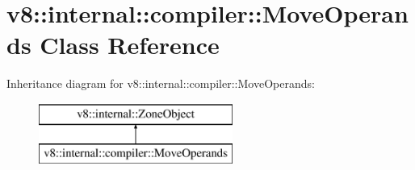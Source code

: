 \hypertarget{classv8_1_1internal_1_1compiler_1_1_move_operands}{}\section{v8\+:\+:internal\+:\+:compiler\+:\+:Move\+Operands Class Reference}
\label{classv8_1_1internal_1_1compiler_1_1_move_operands}
Inheritance diagram for v8\+:\+:internal\+:\+:compiler\+:\+:Move\+Operands\+:\begin{figure}[H]
\begin{center}
\leavevmode
\includegraphics[height=2.000000cm]{classv8_1_1internal_1_1compiler_1_1_move_operands}
\end{center}
\end{figure}
